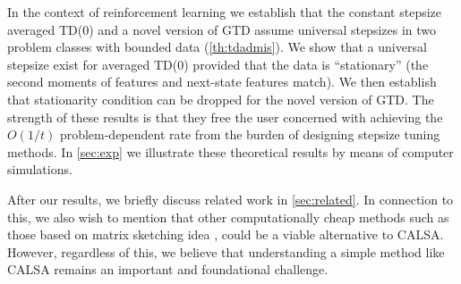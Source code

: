 \begin{enumerate}[topsep=0pt,itemsep=1pt,wide, labelwidth=!, labelindent=0pt,label=\emph{\arabic*}.]
In the context of reinforcement learning we establish that the constant stepsize averaged TD($0$) 
and a novel version of GTD assume universal stepsizes in two 
problem classes with bounded data (\cref{th:tdadmis}).
We show that a universal stepsize exist for averaged TD($0$) 
provided that the data is ``stationary'' (the second moments of features and next-state features match).
We then establish that stationarity condition can be dropped for the novel version of GTD. The strength of these results is that they free the user 
concerned with achieving the $O(1/t)$ problem-dependent rate from the burden of 
designing stepsize tuning methods.
In \cref{sec:exp} we illustrate these theoretical results by means of computer simulations.
\end{enumerate}%
After our results, we briefly discuss related work in \cref{sec:related}.
In connection to this, we also wish to mention
that other computationally cheap methods such as those based on matrix sketching idea \cite{woodruff2014sketching}, could be a viable alternative to  CALSA. 
However, regardless of this, we believe that understanding a simple method like CALSA remains an important and foundational challenge.

